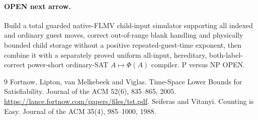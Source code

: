 \documentclass[11pt]{article}
\begin{document}
\paragraph{OPEN next arrow.} Build a total guarded native-FLMV child-input simulator supporting all indexed and ordinary guest moves, correct out-of-range blank handling and physically bounded child storage without a positive repeated-guest-time exponent, then combine it with a separately proved uniform all-input, hereditary, both-label-correct power-short ordinary-SAT $A\mapsto\Phi(A)$ compiler. P versus NP OPEN.

\begin{thebibliography}{9}
 Fortnow, Lipton, van Melkebeek and Viglas. Time-Space Lower Bounds for Satisfiability. Journal of the ACM 52(6), 835--865, 2005. \url{https://lance.fortnow.com/papers/files/tst.pdf}.
 Seiferas and Vitanyi. Counting is Easy. Journal of the ACM 35(4), 985--1000, 1988.
\end{thebibliography}
\end{document}
